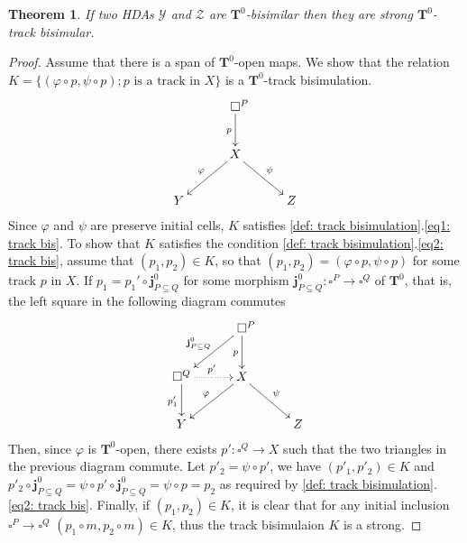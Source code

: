 \documentclass[11pt,a4paper,oldfontcommands]{memoir}
\newcommand{\TrO}{\mathbf{T}}
\newcommand*\jneda{\mathbf{j}}
\newtheorem{theorem}[definition]{Theorem}
\begin{document}
\begin{theorem}
   If two HDAs $\mathcal{Y}$ and $\mathcal{Z}$ are $\TrO^0$-bisimilar then they are strong $\TrO^0$-track bisimular.
        \end{theorem}
\begin{proof}
 Assume that there is a span of $\TrO^0$-open maps. We show that the relation $K=\{ (\varphi \circ p, \psi \circ p); p\text{ is a track in }X \}$ is a $\TrO^0$-track bisimulation.   
$$\xymatrix{
     & ~~ \square^P \ar[d]_{p}\\ &  X \ar[dl]_{\varphi} \ar[dr]^{\psi}   \\
   Y &  &  Z                          }
$$
Since $\varphi$ and $\psi$ are preserve initial cells, $K$ satisfies \ref{def: track bisimulation}.\ref{eq1: track bis}. To show that $K$ satisfies the condition \ref{def: track bisimulation}.\ref{eq2: track bis}, assume that $ (p_1,p_2) \in K$, so that $ (p_1,p_2)=(\varphi \circ p, \psi \circ p)$ for some track $p$ in $X$. If $p_1= p_1' \circ \jneda^0_{P \subseteq Q}$ for some morphism $\jneda^0_{P \subseteq Q}: \square^P \to \square^Q$ of $\TrO^0$, that is, the left square in the following diagram commutes
$$\xymatrix{
     & ~~ \square^P \ar[d]_{p} \ar[dl]_{\jneda^0_{P \subseteq Q}} \\ \square^Q \ar@{.>}[r]^{p'} \ar[d]_{p'_1}  &  X \ar[dl]_{\varphi} \ar[dr]^{\psi}   \\  Y &  &  Z  }
$$
Then, since $\varphi$ is $\TrO^0$-open, there exists $p': \square^Q \to X$ such that the two triangles in the previous diagram commute. Let $p'_2= \psi \circ p'$, we have $(p'_1,p'_2) \in K$ and $p'_2 \circ \jneda^0_{P \subseteq Q}=\psi \circ p' \circ \jneda^0_{P \subseteq Q}= \psi \circ p=p_2$ as required by \ref{def: track bisimulation}.\ref{eq2: track bis}. Finally, if $(p_1,p_2) \in K$, it is clear that for any initial inclusion $\square^P \to \square^Q$ $ (p_1 \circ m, p_2 \circ m) \in K$, thus the track bisimulaion $K$ is a strong. 


\end{proof}
\end{document}
